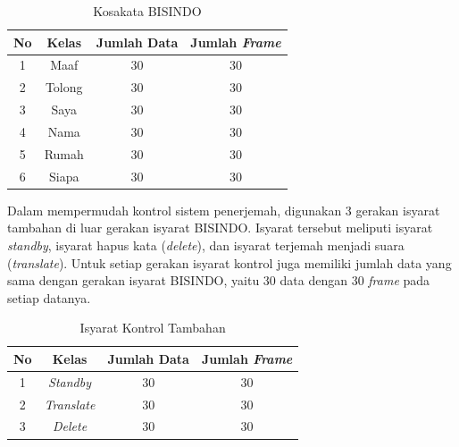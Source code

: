 \begin{longtable}{|c|c|c|c|}
  \caption{Kosakata BISINDO}
  \label{tb:kosakataBISINDO}                                   \\
  \hline
  \rowcolor[HTML]{C0C0C0}
  \textbf{No} & \textbf{Kelas} & \textbf{Jumlah Data} & \textbf{Jumlah \emph{Frame}}\\
  \hline
  1            & Maaf                       & 30            & 30\\
  2            & Tolong                     & 30            & 30\\
  3            & Saya                       & 30            & 30\\
  4            & Nama                       & 30            & 30\\
  5            & Rumah                       & 30            & 30\\
  6            & Siapa                       & 30            & 30\\
  \hline
\end{longtable}


Dalam mempermudah kontrol sistem penerjemah, digunakan 3 gerakan isyarat tambahan di luar gerakan isyarat BISINDO.  Isyarat tersebut meliputi isyarat \textit{standby}, isyarat hapus kata (\textit{delete}), dan isyarat terjemah menjadi suara (\textit{translate}).  Untuk setiap gerakan isyarat kontrol juga memiliki jumlah data yang sama dengan gerakan isyarat BISINDO, yaitu 30 data dengan 30 \emph{frame} pada setiap datanya.

\begin{longtable}{|c|c|c|c|}
  \caption{Isyarat Kontrol Tambahan}
  \label{tb:isyaratkontrol}                                   \\
  \hline
  \rowcolor[HTML]{C0C0C0}
  \textbf{No} & \textbf{Kelas} & \textbf{Jumlah Data} & \textbf{Jumlah \emph{Frame}}\\
  \hline
  1            & \textit{Standby}                       & 30             & 30 \\
  2            & \textit{Translate}                     & 30             & 30 \\
  3            & \textit{Delete}                        & 30             & 30 \\
  \hline
\end{longtable}

